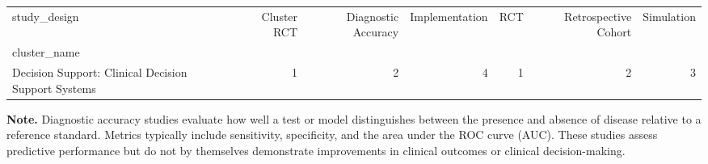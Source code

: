 \begin{tabular}{lrrrrrr}
\toprule
study_design & Cluster RCT & Diagnostic Accuracy & Implementation & RCT & Retrospective Cohort & Simulation \\
cluster_name &  &  &  &  &  &  \\
\midrule
Decision Support: Clinical Decision Support Systems & 1 & 2 & 4 & 1 & 2 & 3 \\
\bottomrule
\end{tabular}


\begin{flushleft}
\footnotesize
\textbf{Note.}
Diagnostic accuracy studies evaluate how well a test or model distinguishes between the presence and absence of disease relative to a reference standard. Metrics typically include sensitivity, specificity, and the area under the ROC curve (AUC). These studies assess predictive performance but do not by themselves demonstrate improvements in clinical outcomes or clinical decision-making.
\end{flushleft}
